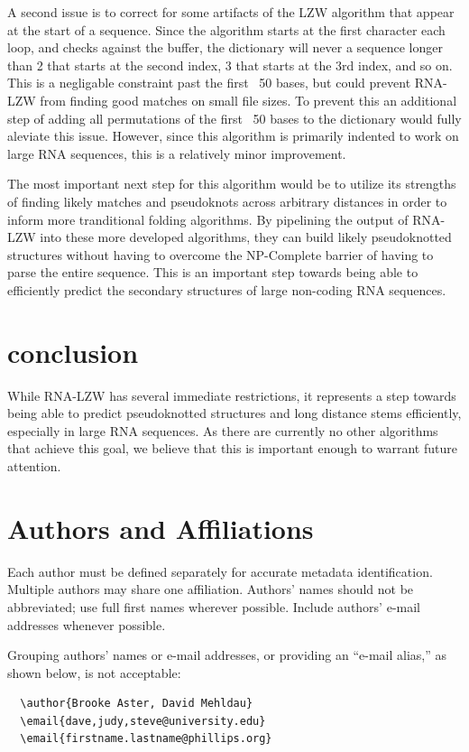 \documentclass[sigconf]{acmart}
\begin{document}
A second issue is to correct for some artifacts of the LZW algorithm that appear at the start of a sequence. Since the algorithm starts at the first character each loop, and checks against the buffer, the dictionary will never a sequence longer than 2 that starts at the second index, 3 that starts at the 3rd index, and so on. This is a negligable constraint past the first ~50 bases, but could prevent RNA-LZW from finding good matches on small file sizes. To prevent this an additional step of adding all permutations of the first ~50 bases to the dictionary would fully aleviate this issue. However, since this algorithm is primarily indented to work on large RNA sequences, this is a relatively minor improvement.

The most important next step for this algorithm would be to utilize its strengths of finding likely matches and pseudoknots across arbitrary distances in order to inform more tranditional folding algorithms. By pipelining the output of RNA-LZW into these more developed algorithms, they can build likely pseudoknotted structures without having to overcome the NP-Complete barrier of having to parse the entire sequence. This is an important step towards being able to efficiently predict the secondary structures of large non-coding RNA sequences. 



\section{conclusion}

While RNA-LZW has several immediate restrictions, it represents a step towards being able to predict pseudoknotted structures and long distance stems efficiently, especially in large RNA sequences. As there are currently no other algorithms that achieve this goal, we believe that this is important enough to warrant future attention.  

\section{Authors and Affiliations}

Each author must be defined separately for accurate metadata
identification. Multiple authors may share one affiliation. Authors'
names should not be abbreviated; use full first names wherever
possible. Include authors' e-mail addresses whenever possible.

Grouping authors' names or e-mail addresses, or providing an ``e-mail
alias,'' as shown below, is not acceptable:
\begin{verbatim}
  \author{Brooke Aster, David Mehldau}
  \email{dave,judy,steve@university.edu}
  \email{firstname.lastname@phillips.org}
\end{verbatim}
\end{document}
